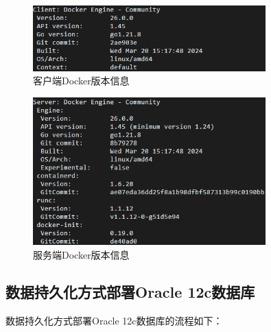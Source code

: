 \begin{figure}[htbp]
	\centering
	\includegraphics[width=0.8\textwidth]{figures/ClientDockerVersion.png}
	\caption{客户端Docker版本信息}
	\label{fig:ClientDockerVersion}
\end{figure}

\begin{figure}[htbp]
	\centering
	\includegraphics[width=0.8\textwidth]{figures/ServerDockerVersion.png}
	\caption{服务端Docker版本信息}
	\label{fig:ServerDockerVersion}
\end{figure}

\subsection{数据持久化方式部署Oracle 12c数据库}

数据持久化方式部署Oracle 12c数据库的流程如下：


